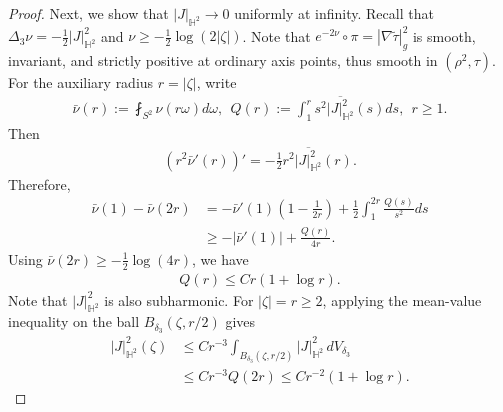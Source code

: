 \documentclass[letterpaper]{amsart}
\theoremstyle{definition}
\theoremstyle{remark}
\begin{document}
\begin{proof}
Next, we show that $|J|_{\mathbb{H}^2} \to 0$ uniformly at infinity. Recall that $\Delta _{3} \nu = -\frac{1}{2} |J|^2_{\mathbb{H}^2}$ and $\nu  \geq -\frac{1}{2} \log (2 |\zeta |)$. Note that $e ^{- 2 \nu }\circ \pi  = |\nabla \tilde{\tau }|^2_g$ is smooth, invariant, and strictly positive at ordinary axis points, thus smooth in $(\rho ^2, \tau )$. For the auxiliary radius $r=|\zeta|$, write
\begin{align*}
	\bar{\nu }(r) := \fint_{S^2} \nu (r \omega ) d \omega ,\ \ Q(r):= \int_{1} ^{r} s ^2\overline{ |J|^2_{\mathbb{H}^2}} (s) ds ,\ \ r \geq 1.  
\end{align*} 
Then 
\begin{align*}
	(r ^2 \bar{\nu }'(r) )' = -\frac{1}{2} r ^2 \overline{ |J|^2_{\mathbb{H}^2}} (r).
\end{align*} 
Therefore,
\begin{align*}
	\bar{\nu }(1) - \bar{\nu }(2 r) &= - \bar{\nu }'(1) \left( 1- \frac{1}{2r} \right) + \frac{1}{2 }\int_{1}^{2r} \frac{Q(s)}{s ^2} ds \\
	&\geq - |\bar{\nu }'(1)| + \frac{Q(r)}{4r}.
\end{align*} 
Using $\bar{\nu }(2r) \geq -\frac{1}{2} \log (4r)$, we have
\begin{align*}
	Q(r) \leq C r(1+ \log r).
\end{align*} 
Note that $|J|^2_{\mathbb{H}^2}$ is also subharmonic. For $|\zeta | = r \geq 2$, applying the mean-value inequality on the ball  $B_{\delta _3}(\zeta , r /2)$ gives
\begin{align*}
|J|^2_{\mathbb{H}^2}(\zeta)
&\leq Cr^{-3}
 \int_{B_{\delta_3}(\zeta,r/2)}|J|^2_{\mathbb{H}^2}\,dV_{\delta_3}\\
&\leq Cr^{-3}Q(2r)
\leq C r ^{-2}(1+\log r).
\end{align*}


\end{proof}
\end{document}
